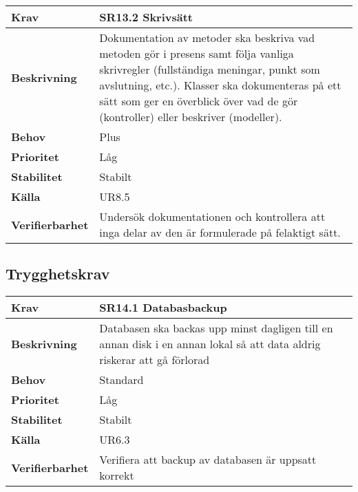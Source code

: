 \documentclass[a4paper, twoside, 11pt, titlepage]{article}
\begin{document}
	\begin {table} [ht] \begin{tabular} { p{2.6cm} p{12.5cm} }
		\hline
		\sffamily\textbf{Krav} & \sffamily\textbf{SR13.2 Skrivsätt } \\
		\hline
		\sffamily\textbf{Beskrivning} & Dokumentation av metoder ska beskriva vad metoden gör i presens samt följa vanliga skrivregler (fullständiga meningar, punkt som avslutning, etc.). Klasser ska dokumenteras på ett sätt som ger en överblick över vad de gör (kontroller) eller beskriver (modeller).  \\
		\hline
		\sffamily\textbf{Behov} & Plus  \\
		\hline
		\sffamily\textbf{Prioritet} & Låg  \\
		\hline
		\sffamily\textbf{Stabilitet} & Stabilt  \\
		\hline
		\sffamily\textbf{Källa} & UR8.5  \\
		\hline
		\sffamily\textbf{Verifierbarhet} & Undersök dokumentationen och kontrollera att inga delar av den är formulerade på felaktigt sätt.  \\
		\hline
	\end{tabular} \end{table} \FloatBarrier


	\subsection{Trygghetskrav}


	\begin {table} [ht] \begin{tabular} { p{2.6cm} p{12.5cm} }
		\hline
		\sffamily\textbf{Krav} & \sffamily\textbf{SR14.1 Databasbackup } \\
		\hline
		\sffamily\textbf{Beskrivning} & Databasen ska backas upp minst dagligen till en annan disk i en annan lokal så att data aldrig riskerar att gå förlorad  \\
		\hline
		\sffamily\textbf{Behov} & Standard  \\
		\hline
		\sffamily\textbf{Prioritet} & Låg  \\
		\hline
		\sffamily\textbf{Stabilitet} & Stabilt  \\
		\hline
		\sffamily\textbf{Källa} & UR6.3  \\
		\hline
		\sffamily\textbf{Verifierbarhet} & Verifiera att backup av databasen är uppsatt korrekt  \\
		\hline
	\end{tabular} \end{table} \FloatBarrier
\end{document}
